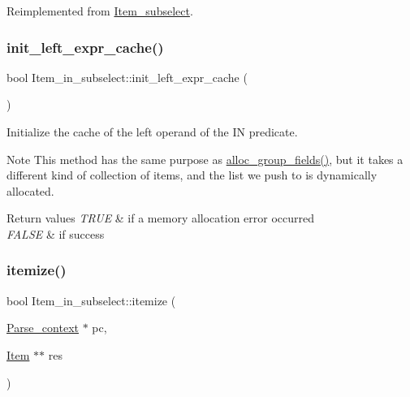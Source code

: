 Reimplemented from \mbox{\hyperlink{classItem__subselect_a8636b93f943b8a52f75222eb4e49c4cf}{Item\+\_\+subselect}}.

\mbox{\label{classItem__in__subselect_a20740a2186be83e3357e1b2f9c707a54}} 
\subsubsection{\texorpdfstring{init\+\_\+left\+\_\+expr\+\_\+cache()}{init\_left\_expr\_cache()}}
{\footnotesize\ttfamily bool Item\+\_\+in\+\_\+subselect\+::init\+\_\+left\+\_\+expr\+\_\+cache (\begin{DoxyParamCaption}{ }\end{DoxyParamCaption})}

Initialize the cache of the left operand of the IN predicate.

\begin{DoxyNote}{Note}
This method has the same purpose as \mbox{\hyperlink{group__Query__Executor_ga108fbed43151ab58878335fbb84503c1}{alloc\+\_\+group\+\_\+fields()}}, but it takes a different kind of collection of items, and the list we push to is dynamically allocated.
\end{DoxyNote}

\begin{DoxyRetVals}{Return values}
{\em T\+R\+UE} & if a memory allocation error occurred \\
\hline
{\em F\+A\+L\+SE} & if success \\
\hline
\end{DoxyRetVals}
\mbox{\label{classItem__in__subselect_a68b1a8d10b94a1e2ff4afddc6eff2d58}} 
\subsubsection{\texorpdfstring{itemize()}{itemize()}}
{\footnotesize\ttfamily bool Item\+\_\+in\+\_\+subselect\+::itemize (\begin{DoxyParamCaption}\item[{\mbox{\hyperlink{structParse__context}{Parse\+\_\+context}} $\ast$}]{pc,  }\item[{\mbox{\hyperlink{classItem}{Item}} $\ast$$\ast$}]{res }\end{DoxyParamCaption})\hspace{0.3cm}{\ttfamily [virtual]}}

